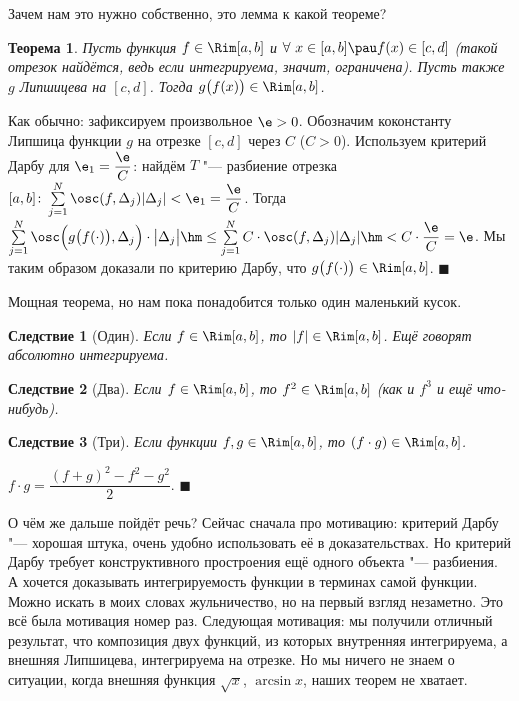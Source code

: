 \documentclass[a4paper,10pt,twoside]{article}
\newtheorem{The}{Теорема}[section]
\newtheorem{Sl}{Следствие}[section]
\newenvironment{Proof}
       {\par\noindent{\textbf{Доказательство.}}}
       {\hfill$\scriptstyle\blacksquare$}
\begin{document}
 Зачем нам это нужно собственно, это лемма к какой теореме?
 
 \begin{The}
 	Пусть функция $f\in\Rim[a,b]$ и $\forall\  x\in[a,b]\pau f(x)\in[c,d]$ (такой отрезок найдётся, ведь если интегрируема, значит, ограничена).
 	Пусть также $g$ Липшицева на $[c,d]$. Тогда $g\big(f(x)\big)\in\Rim[a,b]$.
 \end{The}
 
 \begin{Proof}
 	Как обычно: зафиксируем произвольное $\e>0$. Обозначим коконстанту Липшица функции $g$ на отрезке $[c,d]$ через $C$ ($C>0$).
 	Используем критерий Дарбу для $\e_1=\dfrac{\e}C$: найдём $T$ "--- разбиение отрезка $[a,b]\colon\sum\limits_{j=1}^N\osc(f,\Delta_j)|\Delta_j|<\e_1=\dfrac{\e}{C}$.
 	Тогда $\sum\limits_{j=1}^N\osc\Big(g\big(f(\cdot)\big),\Delta_j\Big)\cdot\big|\Delta_j\big|\hm\leq\sum\limits_{j=1}^NC\cdot\osc(f,\Delta_j)|\Delta_j|\hm<C\cdot\dfrac{\e}C=\e$.
 	Мы таким образом доказали по критерию Дарбу, что $g\big(f(\cdot)\big)\in\Rim[a,b]$.
 \end{Proof}
 
 Мощная теорема, но нам пока понадобится только один маленький кусок.
 
 \begin{Sl}[Один]
 	Если $f\in\Rim[a,b]$, то $|f|\in\Rim[a,b]$. Ещё говорят абсолютно интегрируема.
 \end{Sl}
 
 \begin{Sl}[Два]
 	Если $f\in\Rim[a,b]$, то $f^2\in\Rim[a,b]$ (как и $f^3$ и ещё что-нибудь).
 \end{Sl}
 
 \begin{Sl}[Три]\label{treee}
 	Если функции $f,g\in\Rim[a,b]$, то $(f\cdot g)\in\Rim[a,b]$.
 \end{Sl}
 
 \begin{Proof}
 	$f\cdot g=\dfrac{(f+g)^2-f^2-g^2}2$.
 \end{Proof}
 
 О чём же дальше пойдёт речь? Сейчас сначала про мотивацию: критерий Дарбу "--- хорошая штука, очень удобно использовать её в доказательствах.
 Но критерий Дарбу требует конструктивного простроения ещё одного объекта "--- разбиения. А хочется доказывать интегрируемость функции
 в терминах самой функции. Можно искать в моих словах жульничество, но на первый взгляд незаметно. Это всё была мотивация номер раз.
 Следующая мотивация: мы получили отличный результат, что композиция двух функций, из которых внутренняя интегрируема, а внешняя Липшицева, интегрируема на отрезке. Но мы ничего не
 знаем о ситуации, когда внешняя функция $\sqrt x$, $\arcsin x$, наших теорем не хватает.
 
\end{document}
